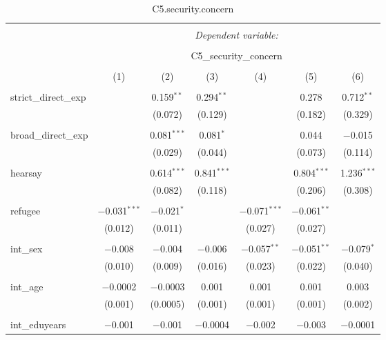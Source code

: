 
\begin{table}[H] \centering 
  \caption{C5.security.concern} 
  \label{} 
\tiny 
\begin{tabular}{@{\extracolsep{4pt}}lcccccc} 
\\[-1.8ex]\hline 
\hline \\[-1.8ex] 
 & \multicolumn{6}{c}{\textit{Dependent variable:}} \\ 
\cline{2-7} 
\\[-1.8ex] & \multicolumn{6}{c}{C5\_security\_concern} \\ 
\\[-1.8ex] & (1) & (2) & (3) & (4) & (5) & (6)\\ 
\hline \\[-1.8ex] 
 strict\_direct\_exp &  & 0.159$^{**}$ & 0.294$^{**}$ &  & 0.278 & 0.712$^{**}$ \\ 
  &  & (0.072) & (0.129) &  & (0.182) & (0.329) \\ 
  & & & & & & \\ 
 broad\_direct\_exp &  & 0.081$^{***}$ & 0.081$^{*}$ &  & 0.044 & $-$0.015 \\ 
  &  & (0.029) & (0.044) &  & (0.073) & (0.114) \\ 
  & & & & & & \\ 
 hearsay &  & 0.614$^{***}$ & 0.841$^{***}$ &  & 0.804$^{***}$ & 1.236$^{***}$ \\ 
  &  & (0.082) & (0.118) &  & (0.206) & (0.308) \\ 
  & & & & & & \\ 
 refugee & $-$0.031$^{***}$ & $-$0.021$^{*}$ &  & $-$0.071$^{***}$ & $-$0.061$^{**}$ &  \\ 
  & (0.012) & (0.011) &  & (0.027) & (0.027) &  \\ 
  & & & & & & \\ 
 int\_sex & $-$0.008 & $-$0.004 & $-$0.006 & $-$0.057$^{**}$ & $-$0.051$^{**}$ & $-$0.079$^{*}$ \\ 
  & (0.010) & (0.009) & (0.016) & (0.023) & (0.022) & (0.040) \\ 
  & & & & & & \\ 
 int\_age & $-$0.0002 & $-$0.0003 & 0.001 & 0.001 & 0.001 & 0.003 \\ 
  & (0.001) & (0.0005) & (0.001) & (0.001) & (0.001) & (0.002) \\ 
  & & & & & & \\ 
 int\_eduyears & $-$0.001 & $-$0.001 & $-$0.0004 & $-$0.002 & $-$0.003 & $-$0.0001 \\ 

\end{tabular}
\end{table}
